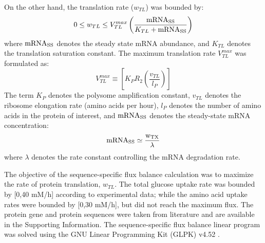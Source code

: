\documentclass[journal=asbcd6,manuscript=article]{achemso}
\begin{document}
On the other hand, the translation rate ($w_{TL}$) was bounded by:
 \begin{equation}
	0\leq w_{TL} \leq V_{TL}^{max}\left(\frac{\rm mRNA_{SS}}{K_{TL}+\rm mRNA_{SS}}\right)
\end{equation}
where $\rm mRNA_{SS}$ denotes the steady state mRNA abundance, and $K_{TL}$ denotes the translation saturation constant.
The maximum translation rate $V_{TL}^{max}$ was formulated as:
\begin{equation}
	V_{TL}^{max} \equiv \left[K_{P} R_{2}\left(\frac{v_{TL}}{l_{P}}\right)\right]
\end{equation}
The term $K_{P}$ denotes the polysome amplification constant,
$v_{TL}$ denotes the ribosome elongation rate (amino acids per hour),
$l_{P}$ denotes the number of amino acids in the protein of interest,
and $\rm mRNA_{SS}$ denotes the steady-state mRNA concentration:
\begin{equation}
	\rm mRNA_{SS}\simeq\frac{w_{TX}}{\lambda}
\end{equation}where $\lambda$ denotes the rate constant controlling the mRNA degradation rate.

The objective of the sequence-specific flux balance calculation was to maximize the rate of protein translation, $w_{TL}$.
The total glucose uptake rate was bounded by [0,40 mM/h] according to experimental data;
while the amino acid uptake rates were bounded by [0,30 mM/h], but did not reach the maximum flux.
The protein gene and protein sequences were taken from literature and are available in the Supporting Information.
The sequence-specific flux balance linear program was solved using the GNU Linear Programming Kit (GLPK) v4.52 \cite{GLPK}.
\end{document}
